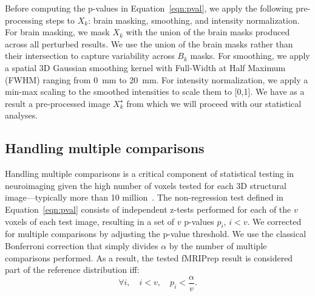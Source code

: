 \documentclass{article}
\newcommand{\fmriprep}{fMRIPrep\xspace}
\newcommand{\fwhm}{\textsc{FWHM}}
\begin{document}
Before computing the p-values in Equation~\ref{eqn:pval}, we apply the following pre-processing steps to $X_k$: brain masking, smoothing, and intensity normalization. For brain masking, we mask $X_k$ with the union of the brain masks produced across all perturbed results. We use the union of the brain masks rather than their intersection to capture variability across $B_k$ masks. For smoothing, we apply a spatial 3D Gaussian smoothing kernel with Full-Width at Half Maximum (\fwhm) ranging from 0~mm to 20~mm. For intensity normalization, we apply a min-max scaling to the smoothed intensities to scale them to [0,1].
We have as a result a pre-processed image $X_k^\star$ from which we will proceed with our statistical analyses.

\subsection{Handling multiple comparisons}

Handling multiple comparisons is a critical component of statistical testing in neuroimaging given the high number of voxels tested for each 3D structural image---typically more than 10 million~\cite{NICHOLS2007246}. The non-regression test defined in Equation~\ref{eqn:pval} consists of independent z-tests performed for each of the $v$ voxels of each test image, resulting in a set of $v$ p-values $p_i$, $i < v$. We corrected for multiple comparisons by adjusting the p-value threshold. We use the classical Bonferroni correction that simply divides $\alpha$ by the number of multiple comparisons performed. As a result, the tested \fmriprep result is considered part of the reference distribution iff:
\begin{equation}
    \label{eq:bonferroni}
    \forall i, \quad i < v, \quad p_i < \frac{\alpha}{v}.
\end{equation}
\end{document}
